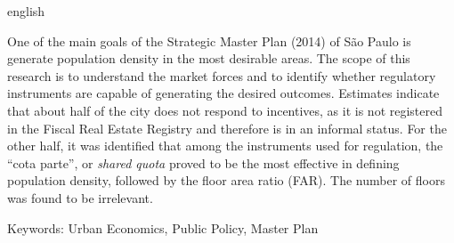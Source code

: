 \documentclass[
  a4paper, 
  12pt, 
  openany, 
  oneside, 
  brazil,
]{abntex2}
\begin{document}
\begin{resumo}[Abstract]
 \begin{otherlanguage*}{english}

  One of the main goals of the Strategic Master Plan (2014) of São Paulo is generate population density in the most desirable areas. The scope of this research is to understand the market forces and to identify whether regulatory instruments are capable of generating the desired outcomes. Estimates indicate that about half of the city does not respond to incentives, as it is not registered in the Fiscal Real Estate Registry and therefore is in an informal status. For the other half, it was identified that among the instruments used for regulation, the ``cota parte'', or \textit{shared quota} proved to be the most effective in defining population density, followed by the floor area ratio (FAR). The number of floors was found to be irrelevant.

Keywords: Urban Economics, Public Policy, Master Plan
 \end{otherlanguage*}
\end{resumo}


\tableofcontents*
\cleardoublepage


\textual
\pagestyle{tccinsper} %



\postextual
 

%







% 
% 
%



% 



\end{document}
